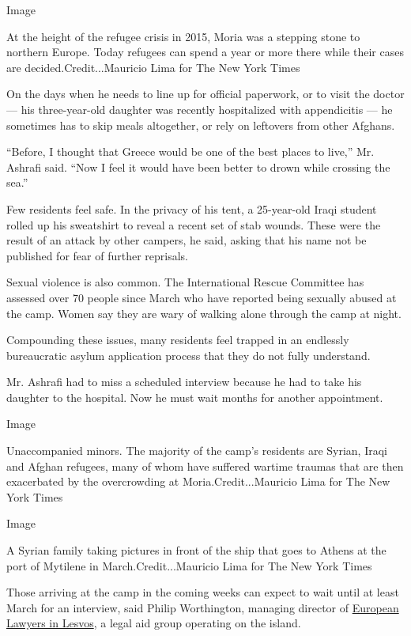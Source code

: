 Image

At the height of the refugee crisis in 2015, Moria was a stepping stone
to northern Europe. Today refugees can spend a year or more there while
their cases are decided.Credit...Mauricio Lima for The New York Times

On the days when he needs to line up for official paperwork, or to visit
the doctor --- his three-year-old daughter was recently hospitalized
with appendicitis --- he sometimes has to skip meals altogether, or rely
on leftovers from other Afghans.

``Before, I thought that Greece would be one of the best places to
live,'' Mr. Ashrafi said. ``Now I feel it would have been better to
drown while crossing the sea.''

Few residents feel safe. In the privacy of his tent, a 25-year-old Iraqi
student rolled up his sweatshirt to reveal a recent set of stab wounds.
These were the result of an attack by other campers, he said, asking
that his name not be published for fear of further reprisals.

Sexual violence is also common. The International Rescue Committee has
assessed over 70 people since March who have reported being sexually
abused at the camp. Women say they are wary of walking alone through the
camp at night.

Compounding these issues, many residents feel trapped in an endlessly
bureaucratic asylum application process that they do not fully
understand.

Mr. Ashrafi had to miss a scheduled interview because he had to take his
daughter to the hospital. Now he must wait months for another
appointment.

Image

Unaccompanied minors. The majority of the camp's residents are Syrian,
Iraqi and Afghan refugees, many of whom have suffered wartime traumas
that are then exacerbated by the overcrowding at Moria.Credit...Mauricio
Lima for The New York Times

Image

A Syrian family taking pictures in front of the ship that goes to Athens
at the port of Mytilene in March.Credit...Mauricio Lima for The New York
Times

Those arriving at the camp in the coming weeks can expect to wait until
at least March for an interview, said Philip Worthington, managing
director of
\href{https://www.europeanlawyersinlesvos.eu/about/}{European Lawyers in
Lesvos}, a legal aid group operating on the island.

